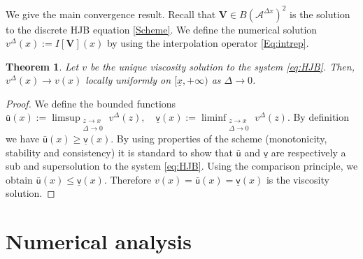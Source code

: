 \documentclass[11pt]{article}
\numberwithin{equation}{section}
\newtheorem{theorem}{Theorem}[section]
\theoremstyle{Claim}
\newcommand{\mA}{\mathcal A}
\def\su{{\mathsf{u}}}
\def\sv{{\mathsf{v}}}
\def\bV{{\mathbf{V}}}
\def\bjm{{\bar{\jmath}}}
\newcommand{\ux}{{\underline x}}
\theoremstyle{plain}
\newcommand{\D}{\Delta}
\newcommand{\Dx}{{\Delta x}}
\begin{document}
We give the main convergence result. Recall that $\bV\in B(\mA^\Dx)^2$ is the solution to the discrete HJB equation \eqref{Scheme}. We define the numerical solution $v^\D(x):=I[\bV](x)$ by using the interpolation operator \eqref{Eq:intrep}.
\begin{theorem}\label{thm:convergence}
Let $v$ be the unique viscosity solution to the system \eqref{eq:HJB}. Then, $v^\D(x)\to v(x)$ locally uniformly on $[\ux,+\infty)$ as $\D\to 0$. 
\end{theorem}
\begin{proof}
We define the bounded functions
$
\bar{\su}(x):=\limsup_{\substack{z\to x\\ \D \to 0}}v^\D(z),\quad \underline{\sv}(x):=\liminf_{\substack{z\to x\\ \D \to 0}}v^\D(z).
$
By definition we have $\bar{\su}(x)\geq \underline{\sv}(x)$. By using properties of the scheme (monotonicity, stability and consistency) it is standard to show that $\bar{\su}$ and $\underline{\sv}$ are respectively a sub and supersolution to the system \eqref{eq:HJB}. Using the comparison principle, we obtain $\bar{\su}(x)\leq \underline{\sv}(x)$. Therefore $v(x)=\bar{\su}(x)= \underline{\sv}(x)$ is the viscosity solution. 
\end{proof}



\section{Numerical analysis}
\end{document}
